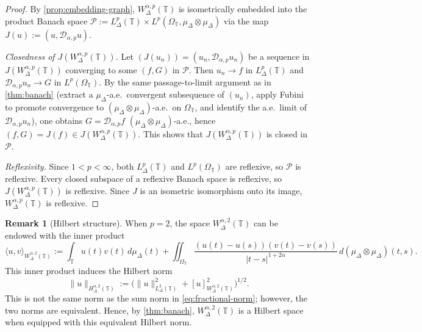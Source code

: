 \documentclass[11pt,a4paper]{article}
\numberwithin{equation}{section}
\theoremstyle{definition}
\newtheorem{remark}[remark]{Remark}
\newcommand{\T}{\mathbb{T}}
\begin{document}
\begin{proof}
By \cref{prop:embedding-graph}, $W^{\alpha,p}_{\Delta}(\T)$ is
isometrically embedded into the product Banach space
$\mathcal{P}:=L^p_{\Delta}(\T)\times L^p(\Omega_{\T},\mu_\Delta\otimes\mu_\Delta)$
via the map $J(u):=(u,\mathcal D_{\alpha,p}u)$.

\smallskip
\noindent\textit{Closedness of $J(W^{\alpha,p}_\Delta(\T))$.}
Let $(J(u_n))=(u_n,\mathcal D_{\alpha,p}u_n)$ be a sequence in
$J(W^{\alpha,p}_\Delta(\T))$ converging to some $(f,G)$ in $\mathcal P$.
Then $u_n\to f$ in $L^p_\Delta(\T)$ and
$\mathcal D_{\alpha,p}u_n\to G$ in $L^p(\Omega_\T)$.
By the same passage-to-limit argument as in \cref{thm:banach}
(extract a $\mu_\Delta$-a.e.\ convergent subsequence of $(u_n)$,
apply Fubini to promote convergence to
$(\mu_\Delta\otimes\mu_\Delta)$-a.e.\ on $\Omega_\T$, and identify
the a.e.\ limit of $\mathcal D_{\alpha,p}u_n$), one obtains
$G=\mathcal D_{\alpha,p}f$ $(\mu_\Delta\otimes\mu_\Delta)$-a.e., hence
$(f,G)=J(f)\in J(W^{\alpha,p}_\Delta(\T))$.
This shows that $J(W^{\alpha,p}_\Delta(\T))$ is closed in $\mathcal P$.

\smallskip
\noindent\textit{Reflexivity.}
Since $1<p<\infty$, both $L^p_\Delta(\T)$ and $L^p(\Omega_\T)$
are reflexive, so $\mathcal P$ is reflexive. Every closed subspace
of a reflexive Banach space is reflexive, so
$J(W^{\alpha,p}_\Delta(\T))$ is reflexive. Since $J$ is an isometric
isomorphism onto its image, $W^{\alpha,p}_\Delta(\T)$ is reflexive.
\end{proof}

\begin{remark}[Hilbert structure]\label{rem:hilbert}
When $p=2$, the space $W^{\alpha,2}_\Delta(\T)$ can be endowed with the inner product
\begin{equation}\label{eq:hilbert-inner-product}
\langle u,v\rangle_{W^{\alpha,2}_{\Delta}(\T)}
:=
\int_{\T}u(t)v(t)\,d\mu_\Delta(t)
+
\iint_{\Omega_{\T}}
\frac{(u(t)-u(s))(v(t)-v(s))}{|t-s|^{1+2\alpha}}
\,d(\mu_\Delta\otimes\mu_\Delta)(t,s).
\end{equation}
This inner product induces the Hilbert norm
\[
\|u\|_{H^{\alpha,2}_\Delta(\T)}
:=
\bigl(\|u\|_{L^2_\Delta(\T)}^2+[u]_{W^{\alpha,2}_\Delta(\T)}^2\bigr)^{1/2}.
\]
This is not the same norm as the sum norm in \eqref{eq:fractional-norm}; however, the two norms are equivalent. Hence, by \cref{thm:banach}, $W^{\alpha,2}_\Delta(\T)$ is a Hilbert space when equipped with this equivalent Hilbert norm.
\end{remark}
\end{document}
